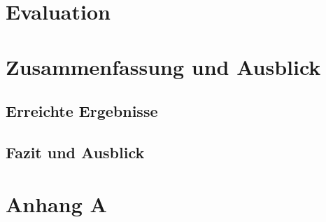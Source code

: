 \documentclass[oneside]{ausarbeitung}
\begin{document}
\chapter{Evaluation}
\label{cha:evaluation}

\chapter{Zusammenfassung und Ausblick}
\label{cha:zusammenfassung}

\section{Erreichte Ergebnisse}
\label{sec:ergebnisse}

\section{Fazit und Ausblick}
\label{sec:ausblick}

\appendix

\printbibliography[heading=bibintoc]

\chapter{Anhang A}
\end{document}
